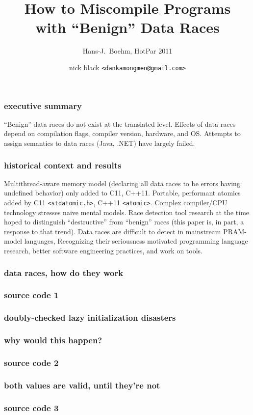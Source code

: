 \documentclass{beamer}
\title{How to Miscompile Programs\\ with ``Benign'' Data Races}
\subtitle{Hans-J.\ Boehm, HotPar 2011}
\author{nick black {\texttt{<dankamongmen@gmail.com>}}}
\institute{Atlanta PWL \#09, 2018-10-09}
\date{}
\begin{document}
\begin{frame}
\titlepage
\end{frame}

\begin{frame}
\frametitle{executive summary}
``Benign'' data races do not exist at the translated level.
\vfill
Effects of data races depend on compilation flags, compiler version, hardware,
and OS.
\vfill
Attempts to assign semantics to data races (Java, .NET) have largely failed.
\end{frame}

\begin{frame}
\frametitle{historical context and results}
Multithread-aware memory model (declaring all data races to be errors having undefined behavior) only added to C11, C++11.
\vfill
Portable, performant atomics added by C11 \texttt{<stdatomic.h>}, C++11 \texttt{<atomic>}.
\vfill
Complex compiler/CPU technology stresses naive mental models.
\vfill
Race detection tool research at the time hoped to distinguish ``destructive'' from ``benign'' races (this paper is, in part, a response to that trend).
\vfill
Data races are difficult to detect in mainstream PRAM-model languages, Recognizing their seriousness motivated programming language research, better software engineering practices, and work on tools.
\end{frame}

\begin{frame}
\frametitle{data races, how do they work}
\end{frame}

\begin{frame}
\frametitle{source code 1}
\end{frame}

\begin{frame}
\frametitle{doubly-checked lazy initialization disasters}
\end{frame}

\begin{frame}
\frametitle{why would this happen?}
\end{frame}

\begin{frame}
\frametitle{source code 2}
\end{frame}

\begin{frame}
\frametitle{both values are valid, until they're not}
\end{frame}

\begin{frame}
\frametitle{source code 3}
\end{frame}
\end{document}
